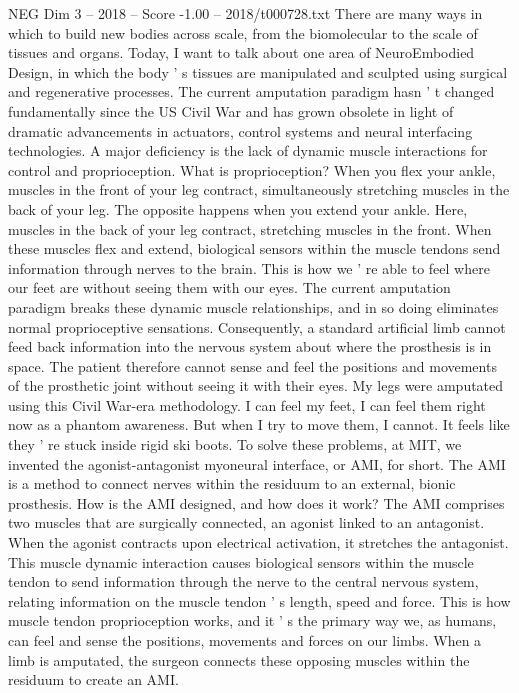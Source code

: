 \begin{textsample}{NEG Dim 3 – 2018 – Score -1.00 – 2018/t000728.txt}
There are many ways in which to build new bodies across scale, from the biomolecular to the scale of tissues and organs.
Today, I want to talk about one area of NeuroEmbodied Design, in which the body ' s tissues are manipulated and sculpted using surgical and regenerative processes.
The current amputation paradigm hasn ' t changed fundamentally since the US Civil War and has grown obsolete in light of dramatic advancements in actuators, control systems and neural interfacing technologies.
A major deficiency is the lack of dynamic muscle interactions for control and proprioception.
What is proprioception?
When you flex your ankle, muscles in the front of your leg contract, simultaneously stretching muscles in the back of your leg.
The opposite happens when you extend your ankle.
Here, muscles in the back of your leg contract, stretching muscles in the front.
When these muscles flex and extend, biological sensors within the muscle tendons send information through nerves to the brain.
This is how we ' re able to feel where our feet are without seeing them with our eyes.
The current amputation paradigm breaks these dynamic muscle relationships, and in so doing eliminates normal proprioceptive sensations.
Consequently, a standard artificial limb cannot feed back information into the nervous system about where the prosthesis is in space.
The patient therefore cannot sense and feel the positions and movements of the prosthetic joint without seeing it with their eyes.
My legs were amputated using this Civil War-era methodology.
I can feel my feet, I can feel them right now as a phantom awareness.
But when I try to move them, I cannot.
It feels like they ' re stuck inside rigid ski boots.
To solve these problems, at MIT, we invented the agonist-antagonist myoneural interface, or AMI, for short.
The AMI is a method to connect nerves within the residuum to an external, bionic prosthesis.
How is the AMI designed, and how does it work?
The AMI comprises two muscles that are surgically connected, an agonist linked to an antagonist.
When the agonist contracts upon electrical activation, it stretches the antagonist.
This muscle dynamic interaction causes biological sensors within the muscle tendon to send information through the nerve to the central nervous system, relating information on the muscle tendon ' s length, speed and force.
This is how muscle tendon proprioception works, and it ' s the primary way we, as humans, can feel and sense the positions, movements and forces on our limbs.
When a limb is amputated, the surgeon connects these opposing muscles within the residuum to create an AMI.

\end{textsample}
